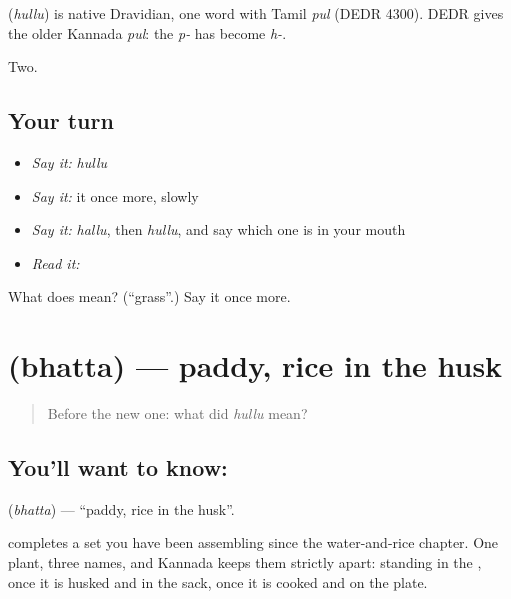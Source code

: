 \begin{cousinweb}
\textbf{} (\emph{hullu}) is native Dravidian, one word with Tamil \emph{pul} (DEDR 4300). DEDR gives the older Kannada \emph{pul}: the \emph{p-} has become \emph{h-}.
\end{cousinweb}

\begin{grammarlens}[title={What you've built}]
Two.
\end{grammarlens}

\subsection*{Your turn}
\begin{itemize}
\raggedright
  \item \emph{Say it:} \emph{hullu}
  \item \emph{Say it:} it once more, slowly
  \item \emph{Say it:} \emph{hallu}, then \emph{hullu}, and say which one is in your mouth
  \item \emph{Read it:} \textbf{}
\end{itemize}

\begin{tcolorbox}[breakable,colback=teal!4,colframe=teal!35!black,title={Before you move on}]
What does  mean? (\textquotedblleft{}grass\textquotedblright{}.) Say it once more.
\end{tcolorbox}
\section[\texorpdfstring{\kn{ಭತ್ತ} (bhatta)}{ಭತ್ತ (bhatta)}]{ (bhatta) — paddy, rice in the husk}

\label{lesson:KA-C66-paddy}



\begin{quote}
Before the new one: what did \emph{hullu} mean?
\end{quote}

\subsection*{You'll want to know: }
\textbf{} (\emph{bhatta}) — \textquotedblleft{}paddy, rice in the husk\textquotedblright{}.

 completes a set you have been assembling since the water-and-rice chapter. One plant, three names, and Kannada keeps them strictly apart:  standing in the ,  once it is husked and in the sack,  once it is cooked and on the plate.

